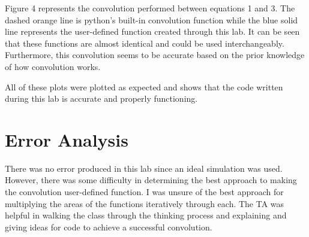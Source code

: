 \documentclass[12pt, titlepage]{article}
\begin{document}
        Figure 4 represents the convolution performed between equations 1 and 3.  The dashed orange line is python's built-in convolution function while the blue solid line represents the user-defined function created through this lab.  It can be seen that these functions are almost identical and could be used interchangeably.  Furthermore, this convolution seems to be accurate based on the prior knowledge of how convolution works.
        
        All of these plots were plotted as expected and shows that the code written during this lab is accurate and properly functioning.
        
        \clearpage
        \section{Error Analysis}
        There was no error produced in this lab since an ideal simulation was used.  However, there was some difficulty in determining the best approach to making the convolution user-defined function.  I was unsure of the best approach for multiplying the areas of the functions iteratively through each.  The TA was helpful in walking the class through the thinking process and explaining and giving ideas for code to achieve a successful convolution.
        
    \newpage    
\end{document}
